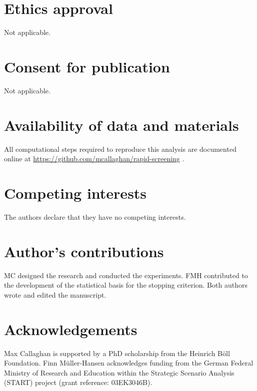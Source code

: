 \documentclass{bmcart}
\providecommand{\DIFadd}[1]{{\protect\color{blue} \sf #1}} %
\providecommand{\DIFaddbegin}{} %
\providecommand{\DIFaddend}{} %
\providecommand{\DIFdelbegin}{} %
\providecommand{\DIFdelend}{} %
\newcommand{\DIFscaledelfig}{0.5}
\newlength{\DIFdelgraphicswidth} %
\newlength{\DIFdelgraphicsheight} %
\newcommand{\DIFaddincludegraphics}[2][]{{\color{blue}\fbox{\DIFOincludegraphics[#1]{#2}}}} %
\newcommand{\DIFdelincludegraphics}[2][]{%
\sbox{\DIFdelgraphicsbox}{\DIFOincludegraphics[#1]{#2}}%
\settoboxwidth{\DIFdelgraphicswidth}{\DIFdelgraphicsbox} %
\settoboxtotalheight{\DIFdelgraphicsheight}{\DIFdelgraphicsbox} %
\scalebox{\DIFscaledelfig}{%
\parbox[b]{\DIFdelgraphicswidth}{\usebox{\DIFdelgraphicsbox}\\[-\baselineskip] \rule{\DIFdelgraphicswidth}{0em}}\llap{\resizebox{\DIFdelgraphicswidth}{\DIFdelgraphicsheight}{%
\setlength{\unitlength}{\DIFdelgraphicswidth}%
\begin{picture}(1,1)%
\thicklines\linethickness{2pt} %
{\color[rgb]{1,0,0}\put(0,0){\framebox(1,1){}}}%
{\color[rgb]{1,0,0}\put(0,0){\line( 1,1){1}}}%
{\color[rgb]{1,0,0}\put(0,1){\line(1,-1){1}}}%
\end{picture}%
}\hspace*{3pt}}} %
} %
\DeclareRobustCommand{\DIFaddbegin}{\DIFOaddbegin \let\includegraphics\DIFaddincludegraphics} %
\DeclareRobustCommand{\DIFaddend}{\DIFOaddend \let\includegraphics\DIFOincludegraphics} %
\DeclareRobustCommand{\DIFdelbegin}{\DIFOdelbegin \let\includegraphics\DIFdelincludegraphics} %
\DeclareRobustCommand{\DIFdelend}{\DIFOaddend \let\includegraphics\DIFOincludegraphics} %
\begin{document}
	
	\begin{backmatter}

		\DIFaddbegin \section*{\DIFadd{Ethics approval}}
		\DIFadd{Not applicable.
		}

		\section*{\DIFadd{Consent for publication}}
		\DIFadd{Not applicable.
		}

		\section*{\DIFadd{Availability of data and materials}} 
		\DIFadd{All computational steps required to reproduce this analysis are documented online at }\url{https://github.com/mcallaghan/rapid-screening}\DIFadd{.
		}

		\DIFaddend \section*{Competing interests}
		The authors declare that they have no competing interests.

		\section*{Author's contributions}
		MC designed the research and conducted the experiments. FMH contributed to the development of the statistical basis for the stopping criterion. Both authors wrote and edited the manuscript.

		\section*{Acknowledgements}
		Max Callaghan is supported by a PhD scholarship from the Heinrich Böll Foundation. Finn M\"{u}ller-Hansen acknowledges funding from the German Federal Ministry of Research and Education within the Strategic Scenario Analysis (START) project (grant reference: 03EK3046B).

		\DIFdelbegin %
\DIFdelend \DIFaddbegin 
		\DIFaddend 

	\end{backmatter}
\end{document}
